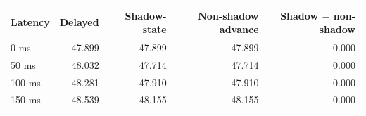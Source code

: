 \begin{tabular}{lrrrr}
\toprule
Latency & Delayed & Shadow-state & Non-shadow advance & Shadow $-$ non-shadow \\
\midrule
0 ms & 47.899 & 47.899 & 47.899 & 0.000 \\
50 ms & 48.032 & 47.714 & 47.714 & 0.000 \\
100 ms & 48.281 & 47.910 & 47.910 & 0.000 \\
150 ms & 48.539 & 48.155 & 48.155 & 0.000 \\
\bottomrule
\end{tabular}
